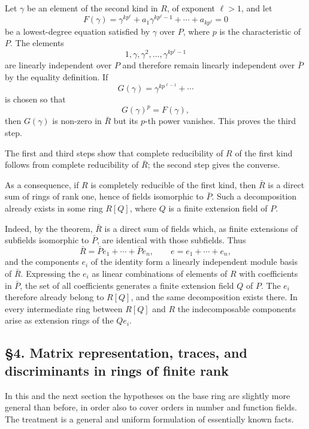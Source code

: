 \documentclass[
  12pt,
]{article}
\begin{document}
Let \(\gamma\) be an element of the second kind in \(R\), of exponent
\(\ell>1\), and let \[
  F(\gamma)=\gamma^{kp^{\ell}}+a_1\gamma^{kp^{\ell}-1}+
\cdots+a_{kp^{\ell}}=0
\] be a lowest-degree equation satisfied by \(\gamma\) over \(P\), where
\(p\) is the characteristic of \(P\). The elements \[
  1,\gamma,
\gamma^2,
\ldots,
\gamma^{kp^{\ell}-1}
\] are linearly independent over \(P\) and therefore remain linearly
independent over \(\bar P\) by the equality definition. If \[
  G(\gamma)=\gamma^{kp^{\ell-1}}+
\cdots
\] is chosen so that \[
  G(\gamma)^p=F(\gamma),
\] then \(G(\gamma)\) is non-zero in \(\bar R\) but its \(p\)-th power
vanishes. This proves the third step.

The first and third steps show that complete reducibility of \(R\) of
the first kind follows from complete reducibility of \(\bar R\); the
second step gives the converse.

As a consequence, if \(R\) is completely reducible of the first kind,
then \(\bar R\) is a direct sum of rings of rank one, hence of fields
isomorphic to \(\bar P\). Such a decomposition already exists in some
ring \(R[Q]\), where \(Q\) is a finite extension field of \(P\).

Indeed, by the theorem, \(\bar R\) is a direct sum of fields which, as
finite extensions of subfields isomorphic to \(\bar P\), are identical
with those subfields. Thus \[
  \bar R=\bar P e_1+
\cdots+\bar P e_n,
  \qquad e=e_1+
\cdots+e_n,
\] and the components \(e_i\) of the identity form a linearly
independent module basis of \(\bar R\). Expressing the \(e_i\) as linear
combinations of elements of \(R\) with coefficients in \(\bar P\), the
set of all coefficients generates a finite extension field \(Q\) of
\(P\). The \(e_i\) therefore already belong to \(R[Q]\), and the same
decomposition exists there. In every intermediate ring between \(R[Q]\)
and \(R\) the indecomposable components arise as extension rings of the
\(Qe_i\).

\subsection{§4. Matrix representation, traces, and discriminants in
rings of finite
rank}\label{matrix-representation-traces-and-discriminants-in-rings-of-finite-rank}

In this and the next section the hypotheses on the base ring are
slightly more general than before, in order also to cover orders in
number and function fields. The treatment is a general and uniform
formulation of essentially known facts.
\end{document}
